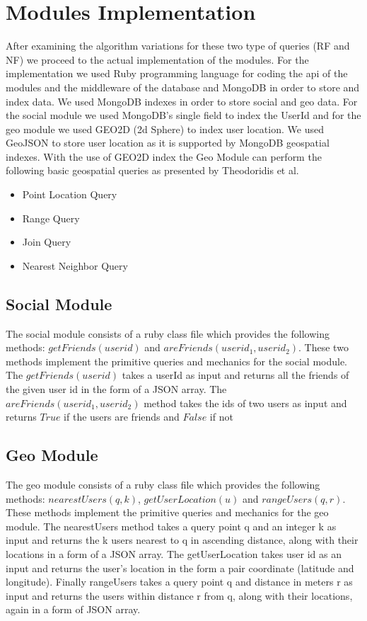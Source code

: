 \documentclass[prodmode,acmtods]{acmsmall} %
\begin{document}
\section{Modules Implementation}
After examining the algorithm variations for these two type of queries (RF and NF) we proceed to the actual implementation of the modules.
For the implementation we used Ruby\cite{ruby} programming language for coding the api of the modules and the middleware of the database and MongoDB\cite{mongod} in order to store and index data.
We used MongoDB indexes in order to store social and geo data. For the social module we used MongoDB's single field to index the UserId and for the geo module we used GEO2D (2d Sphere) to index user location. We used GeoJSON\cite{geoJSON} to store user location as it is supported by MongoDB geospatial indexes. With the use of GEO2D index the Geo Module can perform the following basic geospatial queries as presented by Theodoridis et al. \cite{Corral:ClosestPair}

\begin{itemize}
  \item Point Location Query
  \item Range Query
  \item Join Query
  \item Nearest Neighbor Query
\end{itemize}


\subsection{Social Module}
The social module consists of a ruby class file which provides the following methods:
$getFriends(userid)$ and $areFriends(userid_1, userid_2)$. These two methods implement the primitive queries and mechanics for the social module. 
The $getFriends(userid)$ takes a userId as input and returns all the friends of the given user id in the form of a JSON \cite{json} array.
The $areFriends(userid_1, userid_2)$ method takes the ids of two users as input and returns
$True$ if the users are friends and $False$ if not

\subsection{Geo Module}
The geo module consists of a ruby class file which provides the following methods:
$nearestUsers(q, k)$, $getUserLocation(u)$ and $rangeUsers(q, r)$. These methods implement the primitive queries and mechanics for the geo module.
The nearestUsers method takes a query point q and an integer k as input and returns the k users nearest to q in ascending distance, along with their locations in a form of a JSON\cite{json} array.
The getUserLocation takes user id as an input and returns the user's location in the form a pair coordinate (latitude and longitude).
Finally rangeUsers takes a query point q and distance in meters r as input and returns the users within distance r from q, along with their locations, again in a form of JSON\cite{json} array.
\end{document}
